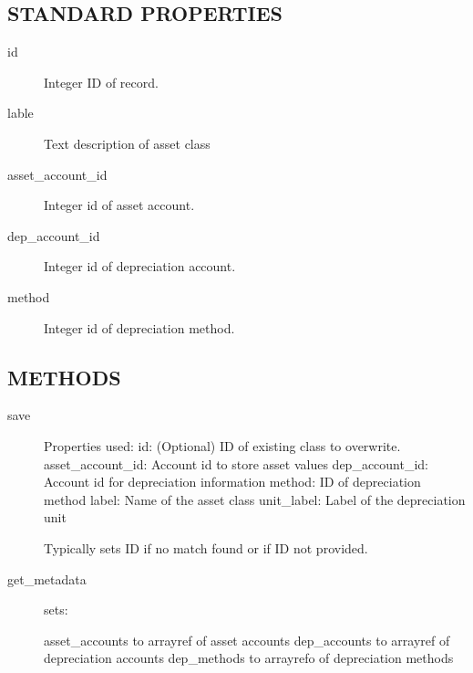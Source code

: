 \begin{description}
\begin{description}
\begin{description}
\begin{description}
\begin{description}
\begin{description}
\begin{description}
\begin{description}
\begin{description}
\begin{description}
\subsection*{STANDARD PROPERTIES\label{LedgerSMB::DBObject::Asset_Class_STANDARD_PROPERTIES}}
\begin{description}

\item[{id}] \mbox{}

Integer ID of record.


\item[{lable}] \mbox{}

Text description of asset class


\item[{asset\_account\_id}] \mbox{}

Integer id of asset account.


\item[{dep\_account\_id}] \mbox{}

Integer id of depreciation account.


\item[{method}] \mbox{}

Integer id of depreciation method.

\end{description}
\subsection*{METHODS\label{LedgerSMB::DBObject::Asset_Class_METHODS}}
\begin{description}

\item[{save}] \mbox{}

Properties used:
id:  (Optional) ID of existing class to overwrite. 
asset\_account\_id: Account id to store asset values
dep\_account\_id: Account id for depreciation information 
method:  ID of depreciation method
label:  Name of the asset class
unit\_label:  Label of the depreciation unit



Typically sets ID if no match found or if ID not provided.


\item[{get\_metadata}] \mbox{}

sets:



asset\_accounts to arrayref of asset accounts
dep\_accounts to arrayref of depreciation accounts
dep\_methods to arrayrefo of depreciation methods



\end{description}
\end{description}
\end{description}
\end{description}
\end{description}
\end{description}
\end{description}
\end{description}
\end{description}
\end{description}
\end{description}
